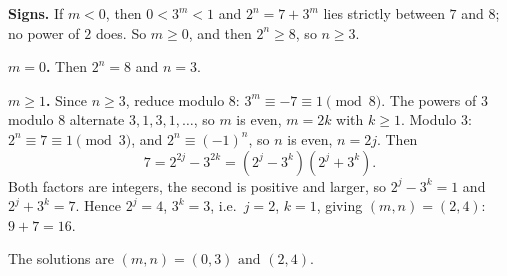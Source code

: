 \textbf{Signs.} If $m<0$, then $0<3^m<1$ and $2^n=7+3^m$ lies strictly between $7$ and $8$; no power of $2$ does. So $m\ge0$, and then $2^n\ge8$, so $n\ge3$.

\textbf{$m=0$.} Then $2^n=8$ and $n=3$.

\textbf{$m\ge1$.} Since $n\ge3$, reduce modulo $8$: $3^m\equiv-7\equiv1\pmod8$. The powers of $3$ modulo $8$ alternate $3,1,3,1,\dots$, so $m$ is even, $m=2k$ with $k\ge1$. Modulo $3$: $2^n\equiv7\equiv1\pmod3$, and $2^n\equiv(-1)^n$, so $n$ is even, $n=2j$. Then
\[
7=2^{2j}-3^{2k}=\left(2^j-3^k\right)\left(2^j+3^k\right).
\]
Both factors are integers, the second is positive and larger, so $2^j-3^k=1$ and $2^j+3^k=7$. Hence $2^j=4$, $3^k=3$, i.e.\ $j=2$, $k=1$, giving $(m,n)=(2,4)$: $9+7=16$.

The solutions are $\boxed{(m,n)=(0,3)\text{ and }(2,4)}$.
